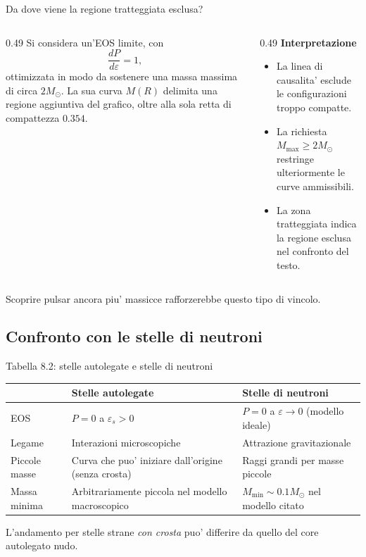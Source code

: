 \begin{frame}{Da dove viene la regione tratteggiata esclusa?}
\small
\begin{columns}[T,onlytextwidth]
\begin{column}{0.49\textwidth}
Si considera un'EOS limite, con
\[
\frac{dP}{d\varepsilon}=1,
\]
ottimizzata in modo da sostenere una massa massima di circa $2M_\odot$.
\medskip
La sua curva $M(R)$ delimita una regione aggiuntiva del grafico, oltre alla sola retta di compattezza $0.354$.
\end{column}
\begin{column}{0.49\textwidth}
\textbf{Interpretazione}
\begin{itemize}
\item La linea di causalita' esclude le configurazioni troppo compatte.
\item La richiesta $M_{\max}\geq2M_\odot$ restringe ulteriormente le curve ammissibili.
\item La zona tratteggiata indica la regione esclusa nel confronto del testo.
\end{itemize}
\end{column}
\end{columns}
\medskip
Scoprire pulsar ancora piu' massicce rafforzerebbe questo tipo di vincolo.
\end{frame}

\subsection{Confronto con le stelle di neutroni}

\begin{frame}{Tabella 8.2: stelle autolegate e stelle di neutroni}
\footnotesize
\setlength{\tabcolsep}{4pt}
\begin{center}
\begin{tabular}{p{}p{}p{}}
\hline
 & \textbf{Stelle autolegate} & \textbf{Stelle di neutroni} \\
\hline
EOS & $P=0$ a $\varepsilon_s>0$ & $P=0$ a $\varepsilon\to0$ (modello ideale) \\
Legame & Interazioni microscopiche & Attrazione gravitazionale \\
Piccole masse & Curva che puo' iniziare dall'origine (senza crosta) & Raggi grandi per masse piccole \\
Massa minima & Arbitrariamente piccola nel modello macroscopico & $M_{\min}\sim0.1M_\odot$ nel modello citato \\
\hline
\end{tabular}
\end{center}
\medskip
L'andamento per stelle strane \emph{con crosta} puo' differire da quello del core autolegato nudo.
\end{frame}

